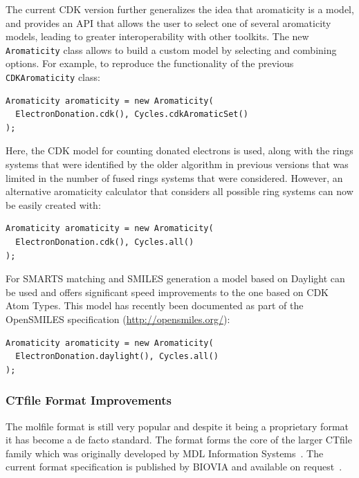 \documentclass[doublespacing]{bmcart}
\begin{document}
The current CDK version further generalizes the idea that aromaticity
is a model, and provides an API that allows the user to select one of
several aromaticity models, leading to greater interoperability with
other toolkits. The new \texttt{Aromaticity} class allows to build a
custom model by selecting and combining options. For example, to
reproduce the functionality of the previous \texttt{CDKAromaticity} class:

\vspace{0.2cm}
\begin{verbatim}
Aromaticity aromaticity = new Aromaticity(
  ElectronDonation.cdk(), Cycles.cdkAromaticSet()
);
\end{verbatim}
\vspace{0.2cm}

Here, the CDK model for counting donated electrons is used, along with
the rings systems that were identified by the older algorithm in
previous versions that was limited in the number of fused rings
systems that were considered. However, an alternative aromaticity
calculator that considers all possible ring systems can now be
easily created with:

\vspace{0.2cm}
\begin{verbatim}
Aromaticity aromaticity = new Aromaticity(
  ElectronDonation.cdk(), Cycles.all()
);
\end{verbatim}
\vspace{0.2cm}

For SMARTS matching and SMILES generation a model based
on Daylight \cite{DaylightCIS} can be used and offers significant
speed improvements to the one based on CDK Atom Types. 
This model has recently been documented as part of the
OpenSMILES specification (\url{http://opensmiles.org/}):

\vspace{0.2cm}
\begin{verbatim}
Aromaticity aromaticity = new Aromaticity(
  ElectronDonation.daylight(), Cycles.all()
);
\end{verbatim}
\vspace{0.2cm}


\subsubsection*{CTfile Format Improvements}

The molfile format is still very popular and despite it being a proprietary
format it has become a de facto standard. The format forms the core of the larger
CTfile family which was originally developed by MDL Information Systems~\cite{Dalby92}. The
current format specification is published by BIOVIA and available on 
request~\cite{ctfilespec}.
 
\end{document}
